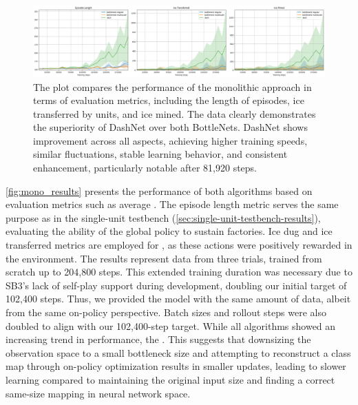 \begin{figure}[htbp]
    \centering
    \includegraphics[width=1\linewidth]{images/results_monolithic/mono_results.png}
    \captionsetup{justification=justified, singlelinecheck=false, width=1\linewidth, labelfont=bf} 
    \caption[]{The plot compares the performance of the monolithic approach in terms of evaluation metrics, including the length of episodes, ice transferred by units, and ice mined. The data clearly demonstrates the superiority of DashNet over both BottleNets. DashNet shows improvement across all aspects, achieving higher training speeds, similar fluctuations, stable learning behavior, and consistent enhancement, particularly notable after 81,920 steps.}
    \label{fig:mono_results}
\end{figure}


\noindent \autoref{fig:mono_results} presents the performance of both algorithms based on evaluation metrics such as average . The episode length metric serves the same purpose as in the single-unit testbench (\autoref{sec:single-unit-testbench-results}), evaluating the ability of the global policy to sustain factories. Ice dug and ice transferred metrics are employed for , as these actions were positively rewarded in the environment. The results represent data from three trials, trained from scratch up to 204,800 steps. This extended training duration was necessary due to SB3's lack of self-play support during development, doubling our initial target of 102,400 steps. Thus, we provided the model with the same amount of data, albeit from the same on-policy perspective. Batch sizes and rollout steps were also doubled to align with our 102,400-step target. While all algorithms showed an increasing trend in performance, the . This suggests that downsizing the observation space to a small bottleneck size and attempting to reconstruct a class map through on-policy optimization results in smaller updates, leading to slower learning compared to maintaining the original input size and finding a correct same-size mapping in neural network space.

